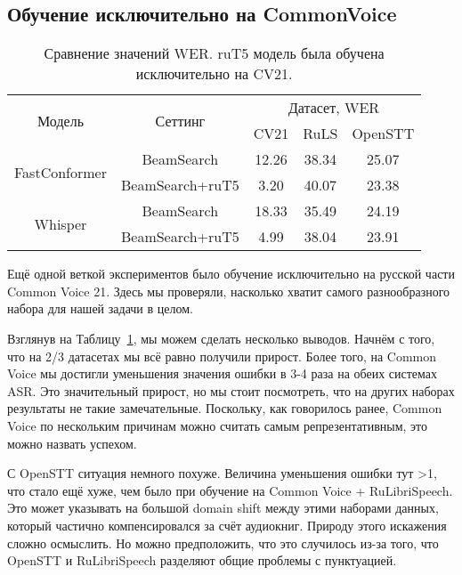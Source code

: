 \subsection{Обучение исключительно на CommonVoice}
\begin{table}[]
\centering
\caption{Сравнение значений WER. ruT5 модель была обучена исключительно на CV21.}
\begin{tabular}{|c|c|ccc|}
\hline
\multirow{2}{*}{Модель}        & \multirow{2}{*}{Сеттинг}             & \multicolumn{3}{c|}{Датасет, WER}                                    \\ \cline{3-5} 
                               &                                      & \multicolumn{1}{c|}{CV21}  & \multicolumn{1}{c|}{RuLS}     & OpenSTT \\ \hline
\multirow{2}{*}{FastConformer} & BeamSearch                           & \multicolumn{1}{c|}{12.26} & \multicolumn{1}{c|}{38.34}    & 25.07   \\ \cline{2-5} 
                               & BeamSearch+ruT5                      & \multicolumn{1}{c|}{3.20}  & \multicolumn{1}{c|}{40.07}    & 23.38   \\ \hline
\multirow{2}{*}{Whisper}       & BeamSearch                           & \multicolumn{1}{c|}{18.33} & \multicolumn{1}{c|}{35.49}    & 24.19   \\ \cline{2-5} 
                               & BeamSearch+ruT5                      & \multicolumn{1}{c|}{4.99}  & \multicolumn{1}{c|}{38.04}    & 23.91   \\ \hline
\end{tabular}
\label{tab:res_cv_trained}
\end{table}

Ещё одной веткой экспериментов было обучение исключительно на русской части Common Voice 21.
Здесь мы проверяли, насколько хватит самого разнообразного набора для нашей задачи в целом.

Взглянув на Таблицу~\ref{tab:res_cv_trained}, мы можем сделать несколько выводов.
Начнём с того, что на 2/3 датасетах мы всё равно получили прирост.
Более того, на Common Voice мы достигли уменьшения значения ошибки в 3-4 раза на обеих системах ASR.
Это значительный прирост, но мы стоит посмотреть, что на других наборах результаты не такие замечательные.
Поскольку, как говорилось ранее, Common Voice по нескольким причинам можно считать самым репрезентативным, это можно назвать успехом.

С OpenSTT ситуация немного похуже.
Величина уменьшения ошибки тут >1, что стало ещё хуже, чем было при обучение на Common Voice + RuLibriSpeech.
Это может указывать на большой domain shift между этими наборами данных, который частично компенсировался за счёт аудиокниг.
Природу этого искажения сложно осмыслить.
Но можно предположить, что это случилось из-за того, что OpenSTT и RuLibriSpeech разделяют общие проблемы с пунктуацией.

